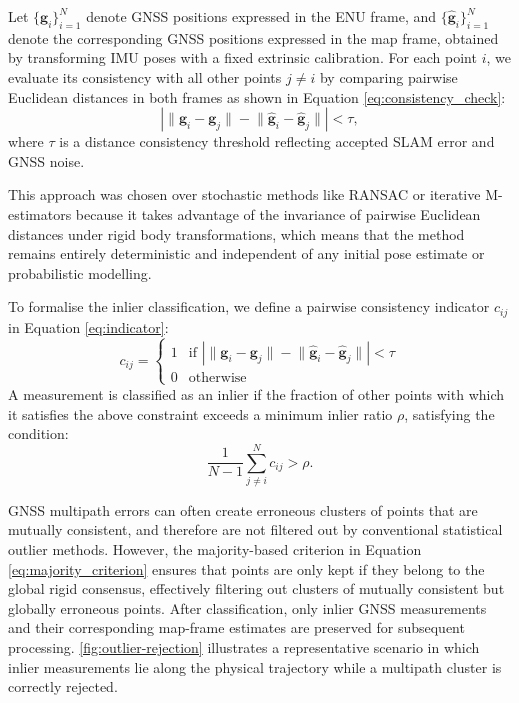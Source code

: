 Let $\{\mathbf{g}_i\}_{i=1}^{N}$ denote GNSS positions expressed in the ENU frame, and $\{\hat{\mathbf{g}}_i\}_{i=1}^{N}$ denote the corresponding GNSS positions expressed in the map frame, obtained by transforming IMU poses with a fixed extrinsic calibration. For each point $i$, we evaluate its consistency with all other points $j \neq i$ by comparing pairwise Euclidean distances in both frames as shown in Equation \eqref{eq:consistency_check}:
\begin{equation}
\label{eq:consistency_check}
\left| \lVert \mathbf{g}_i - \mathbf{g}_j \rVert - \lVert \hat{\mathbf{g}}_i - \hat{\mathbf{g}}_j \rVert \right| < \tau,
\end{equation}
where $\tau$ is a distance consistency threshold reflecting accepted SLAM error and GNSS noise.

This approach was chosen over stochastic methods like RANSAC \cite{fischlerRandomSampleConsensus1981} or iterative M-estimators because it takes advantage of the invariance of pairwise Euclidean distances under rigid body transformations, which means that the method remains entirely deterministic and independent of any initial pose estimate or probabilistic modelling.

To formalise the inlier classification, we define a pairwise consistency indicator $c_{ij}$ in Equation \eqref{eq:indicator}:
\begin{equation}
\label{eq:indicator}
c_{ij} = 
\begin{cases} 
1 & \text{if } \left| \lVert \mathbf{g}_i - \mathbf{g}_j \rVert - \lVert \hat{\mathbf{g}}_i - \hat{\mathbf{g}}_j \rVert \right| < \tau \\
0 & \text{otherwise}
\end{cases}
\end{equation}
A measurement is classified as an inlier if the fraction of other points with which it satisfies the above constraint exceeds a minimum inlier ratio $\rho$, satisfying the condition:
\begin{equation}
\label{eq:majority_criterion}
\frac{1}{N-1} \sum_{j \neq i}^{N} c_{ij} > \rho.
\end{equation}

GNSS multipath errors \cite{wenExclusionGNSSNLOS2018} can often create erroneous clusters of points that are mutually consistent, and therefore are not filtered out by conventional statistical outlier methods. However, the majority-based criterion in Equation \eqref{eq:majority_criterion} ensures that points are only kept if they belong to the global rigid consensus, effectively filtering out clusters of mutually consistent but globally erroneous points. After classification, only inlier GNSS measurements and their corresponding map-frame estimates are preserved for subsequent processing. \cref{fig:outlier-rejection} illustrates a representative scenario in which inlier measurements lie along the physical trajectory while a multipath cluster is correctly rejected.

